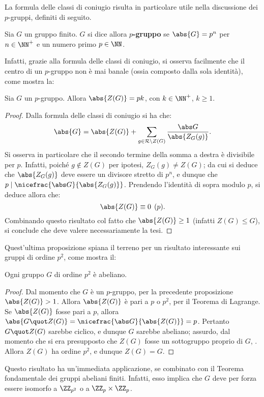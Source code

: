 \documentclass[12pt]{scrartcl}
\begin{document}
	
	La formula delle classi di coniugio risulta in particolare utile nella discussione
	dei $p$-gruppi, definiti di seguito.
	
	\begin{definition}[$p$-gruppo]
		Sia $G$ un gruppo finito. $G$ si dice allora \textbf{$p$-gruppo} se
		$\abs{G} = p^n$ per $n \in \NN^+$ e un numero primo $p \in \NN$.
	\end{definition}
	
	Infatti, grazie alla formula delle classi di coniugio, si osserva facilmente che il centro di un $p$-gruppo non è mai banale (ossia composto dalla sola identità), come mostra la:
	
	\begin{proposition}
		Sia $G$ un $p$-gruppo. Allora $\abs{Z(G)} = pk$, con $k \in \NN^+$, $k \geq 1$. 
	\end{proposition}
	
	\begin{proof}
		Dalla formula delle classi di coniugio si ha che:
		\[ \abs{G} = \abs{Z(G)} + \sum_{g \in \mathcal{R} \setminus Z(G)} \frac{\abs G}{\abs{Z_G(g)}}. \]
		Si osserva in particolare che il secondo termine della somma a destra è divisibile
		per $p$. Infatti, poiché $g \notin Z(G)$ per ipotesi, $Z_G(g) \neq Z(G)$; da cui
		si deduce che $\abs{Z_G(g)}$ deve essere un divisore stretto di $p^n$, e dunque
		che $p \mid \nicefrac{\abs G}{\abs{Z_G(g)}}$. Prendendo l'identità di sopra modulo
		$p$, si deduce allora che:
		\[ \abs{Z(G)} \equiv 0 \pod p. \]
		Combinando questo risultato col fatto che $\abs{Z(G)} \geq 1$ (infatti $Z(G) \leq G$),
		si conclude che deve valere necessariamente la tesi.
	\end{proof} \medskip
	
	
	Quest'ultima proposizione spiana il terreno per un risultato interessante sui
	gruppi di ordine $p^2$, come mostra il:
	
	\begin{theorem}
		Ogni gruppo $G$ di ordine $p^2$ è abeliano.
	\end{theorem}
	
	\begin{proof}
		Dal momento che $G$ è un $p$-gruppo, per la precedente proposizione
		$\abs{Z(G)} > 1$. Allora $\abs{Z(G)}$ è pari a $p$ o $p^2$, per il
		Teorema di Lagrange. Se $\abs{Z(G)}$ fosse pari a $p$, allora
		$\abs{G \quot Z(G)} = \nicefrac{\abs G}{\abs{Z(G)}} = p$. Pertanto
		$G \quot Z(G)$ sarebbe ciclico, e dunque $G$ sarebbe abeliano; assurdo,
		dal momento che si era presupposto che $Z(G)$ fosse un sottogruppo proprio
		di $G$, \Lightning. Allora $Z(G)$ ha ordine $p^2$,
		e dunque $Z(G) = G$.
	\end{proof}
	
	Questo risultato ha un'immediata applicazione, se combinato con il Teorema
	fondamentale dei gruppi abeliani finiti. Infatti, esso implica che
	$G$ deve per forza essere isomorfo a $\ZZ_{p^2}$ o a $\ZZ_{p} \times \ZZ_{p}$.
\end{document}
